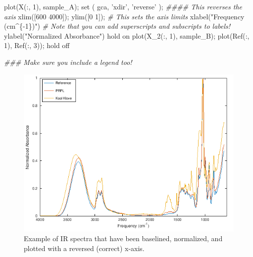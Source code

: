 \documentclass[]{tufte-book}
\newenvironment{Shaded}{}{}
\newcommand{\CommentTok}[1]{\textcolor[rgb]{0.38,0.63,0.69}{\textit{#1}}}
\newcommand{\FloatTok}[1]{\textcolor[rgb]{0.25,0.63,0.44}{#1}}
\newcommand{\FunctionTok}[1]{\textcolor[rgb]{0.02,0.16,0.49}{#1}}
\newcommand{\NormalTok}[1]{#1}
\newcommand{\OperatorTok}[1]{\textcolor[rgb]{0.40,0.40,0.40}{#1}}
\newcommand{\StringTok}[1]{\textcolor[rgb]{0.25,0.44,0.63}{#1}}
\begin{document}
\begin{Shaded}
\begin{Highlighting}[]
\FunctionTok{plot}\NormalTok{(X(}\OperatorTok{:,} \FloatTok{1}\NormalTok{)}\OperatorTok{,}\NormalTok{ sample_A)}\OperatorTok{;}
\FunctionTok{set}\NormalTok{ ( }\FunctionTok{gca}\OperatorTok{,} \StringTok{'xdir'}\OperatorTok{,} \StringTok{'reverse'}\NormalTok{ )}\OperatorTok{;} \CommentTok{#### This reverses the axis}
\FunctionTok{xlim}\NormalTok{([}\FloatTok{600} \FloatTok{4000}\NormalTok{])}\OperatorTok{;} \FunctionTok{ylim}\NormalTok{([}\FloatTok{0} \FloatTok{1}\NormalTok{])}\OperatorTok{;}  \CommentTok{# This sets the axis limits}
\FunctionTok{xlabel}\NormalTok{(}\StringTok{"Frequency (cm^\{-1\})"}\NormalTok{)   }\CommentTok{# Note that you can add superscripts and subscripts to labels!}
\FunctionTok{ylabel}\NormalTok{(}\StringTok{"Normalized Absorbance"}\NormalTok{)}
\FunctionTok{hold}\NormalTok{ on}
\FunctionTok{plot}\NormalTok{(X_2(}\OperatorTok{:,} \FloatTok{1}\NormalTok{)}\OperatorTok{,}\NormalTok{ sample_B)}\OperatorTok{;}
\FunctionTok{plot}\NormalTok{(Ref(}\OperatorTok{:,} \FloatTok{1}\NormalTok{)}\OperatorTok{,}\NormalTok{ Ref(}\OperatorTok{:,} \FloatTok{3}\NormalTok{))}\OperatorTok{;}
\FunctionTok{hold}\NormalTok{ off}

\CommentTok{### Make sure you include a legend too!}
\end{Highlighting}
\end{Shaded}

\begin{figure}
\centering
\includegraphics{./images/ir-spectrum-example.png}
\caption{Example of IR spectra that have been baselined, normalized, and plotted with a reversed (correct) x-axis.}
\end{figure}
\end{document}
